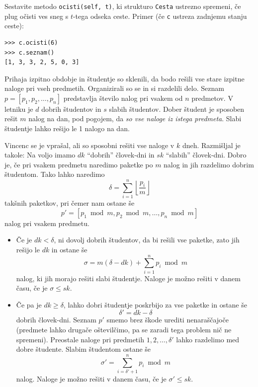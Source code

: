 \documentclass[arhiv]{../izpit}
\begin{document}
\podnaloga[10 točk]
Sestavite metodo \texttt{ocisti(self, t)}, ki strukturo \texttt{Cesta} ustrezno spremeni, če plug očisti ves sneg s $t$-tega odseka ceste. Primer (če \texttt{c} ustreza zadnjemu stanju ceste):
%
\begin{verbatim}
>>> c.ocisti(6)
>>> c.seznam()
[1, 3, 3, 2, 5, 0, 3]
\end{verbatim}

Prihaja izpitno obdobje in študentje so sklenili, da bodo rešili vse stare izpitne naloge pri vseh predmetih.
Organizirali so se in si razdelili delo. Seznam $p = [p_1, p_2, \ldots, p_n]$ predstavlja število nalog pri vsakem od $n$ predmetov. V letniku je $d$
dobrih študentov in $s$ slabih študentov. Dober študent je sposoben rešit $m$ nalog na dan, pod pogojem, da \emph{so
vse naloge iz istega predmeta}. Slabi študentje lahko rešijo le 1 nalogo na dan.

Vincenc se je vprašal, ali so sposobni rešiti vse naloge v $k$ dneh. Razmišljal je takole: 
Na voljo imamo $dk$ ``dobrih'' človek-dni in $sk$ ``slabih'' človek-dni. Dobro je, če pri vsakem predmetu naredimo paketke po $m$ nalog in jih razdelimo dobrim študentom. Tako lahko naredimo
$$
\delta = \sum_{i=1}^{n} \left\lfloor \frac{p_i}{m} \right\rfloor 
$$
takšnih paketkov, pri čemer nam ostane še
$$
p' = [p_1 \bmod m, p_2 \bmod m, \ldots, p_n \bmod m]
$$
nalog pri vsakem predmetu.
\begin{itemize}
\item
Če je $dk < \delta$, ni dovolj dobrih študentov, da bi rešili vse paketke, zato jih rešijo le $dk$ in ostane še 
$$\sigma = m(\delta - dk) +  \sum_{i=1}^{n} p_i \bmod m $$
nalog, ki jih morajo rešiti slabi študentje. Naloge je možno rešiti v danem času, če je $\sigma \leq sk$.
\item
Če pa je $dk \geq \delta$, lahko dobri študentje poskrbijo za vse paketke in ostane še
$$
\delta' = dk - \delta
$$
dobrih človek-dni. Seznam $p'$ smemo brez škode urediti nenaraščajoče (predmete lahko drugače oštevilčimo, pa se zaradi tega problem nič ne spremeni). Preostale naloge pri predmetih $1, 2, \ldots, \delta'$ lahko razdelimo med dobre študente. Slabim študentom ostane še
$$
\sigma' = \sum_{i=\delta'+1}^{n} p_i \bmod m
$$
nalog. Naloge je možno rešiti v danem času, če je $\sigma' \leq sk$.
\end{itemize}
\end{document}
